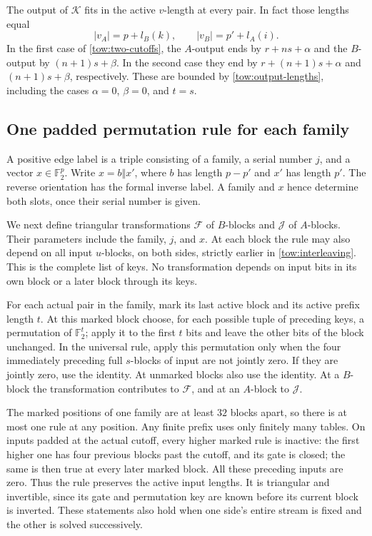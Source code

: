 The output of \(\mathcal K\) fits in the active \(v\)-length at
every pair.  In fact those lengths equal
\begin{equation}
 |v_A|=p+l_B(k),\qquad |v_B|=p'+l_A(i).
 \label{tow:output-lengths}
\end{equation}
In the first case of \eqref{tow:two-cutoffs}, the \(A\)-output ends
by \(r+ns+\alpha\) and the \(B\)-output by
\((n+1)s+\beta\).  In the second case they end by
\(r+(n+1)s+\alpha\) and \((n+1)s+\beta\), respectively.
These are bounded by \eqref{tow:output-lengths}, including the cases
\(\alpha=0\), \(\beta=0\), and \(t=s\).

\subsection{One padded permutation rule for each family}

A positive edge label is a triple consisting of a family, a serial
number \(j\), and a vector \(x\in\mathbb F _2^p\).  Write
\(x=b\Vert x'\), where \(b\) has length \(p-p'\) and \(x'\)
has length \(p'\).  The reverse orientation has the formal inverse
label.  A family and \(x\) hence determine both slots, once their
serial number is given.

We next define triangular transformations \(\mathcal F\) of
\(B\)-blocks and \(\mathcal J\) of \(A\)-blocks.  Their parameters
include the family, \(j\), and \(x\).  At each block the rule may
also depend on all input \(u\)-blocks, on both sides, strictly earlier
in \eqref{tow:interleaving}.  This is the complete list of keys.
No transformation depends on input bits in its own block or a later
block through its keys.

For each actual pair in the family, mark its last active block and
its active prefix length \(t\).  At this marked block choose, for
each possible tuple of preceding keys, a permutation of
\(\mathbb F _2^t\); apply it to the first \(t\) bits and leave
the other bits of the block unchanged.  In the universal rule, apply
this permutation only when the four immediately preceding full
\(s\)-blocks of input are not jointly zero.  If they are jointly
zero, use the identity.  At unmarked blocks also use the identity.
At a \(B\)-block the transformation contributes to \(\mathcal F\),
and at an \(A\)-block to \(\mathcal J\).

The marked positions of one family are at least \(32\) blocks apart,
so there is at most one rule at any position.  Any finite prefix uses
only finitely many tables.  On inputs padded at the actual cutoff,
every higher marked rule is inactive: the first higher one has four
previous blocks past the cutoff, and its gate is closed; the same is
then true at every later marked block.  All these preceding inputs
are zero.  Thus the rule preserves the active input lengths.  It is
triangular and invertible, since its gate and permutation key are
known before its current block is inverted.  These statements also
hold when one side's entire stream is fixed and the other is solved
successively.

